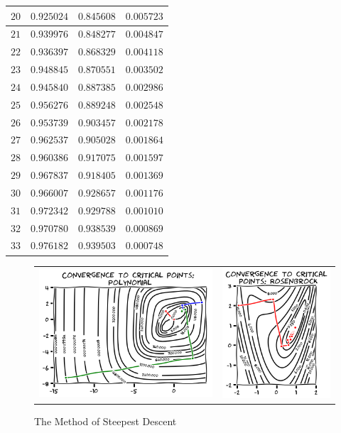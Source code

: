 \begin{example}
\begin{center}
\begin{tabular}{|r|r|r|r|}
$20$ & $0.925024$ & $0.845608$ & $0.005723$ \\ \hline 
$21$ & $0.939976$ & $0.848277$ & $0.004847$ \\ \hline 
$22$ & $0.936397$ & $0.868329$ & $0.004118$ \\ \hline 
$23$ & $0.948845$ & $0.870551$ & $0.003502$ \\ \hline 
$24$ & $0.945840$ & $0.887385$ & $0.002986$ \\ \hline 
$25$ & $0.956276$ & $0.889248$ & $0.002548$ \\ \hline 
$26$ & $0.953739$ & $0.903457$ & $0.002178$ \\ \hline 
$27$ & $0.962537$ & $0.905028$ & $0.001864$ \\ \hline 
$28$ & $0.960386$ & $0.917075$ & $0.001597$ \\ \hline 
$29$ & $0.967837$ & $0.918405$ & $0.001369$ \\ \hline 
$30$ & $0.966007$ & $0.928657$ & $0.001176$ \\ \hline 
$31$ & $0.972342$ & $0.929788$ & $0.001010$ \\ \hline 
$32$ & $0.970780$ & $0.938539$ & $0.000869$ \\ \hline 
$33$ & $0.976182$ & $0.939503$ & $0.000748$ \\ \hline 
\end{tabular}
\end{center}
\end{example}


\begin{figure}[ht!]
\begin{tabular}{cc}
\includegraphics[width=0.62\linewidth]{convergenceSteepest.png} &
\includegraphics[width=0.38\linewidth]{SDR3.png}
\end{tabular}
\caption{The Method of Steepest Descent}
\label{figure:SteepestConvergence}
\end{figure}
